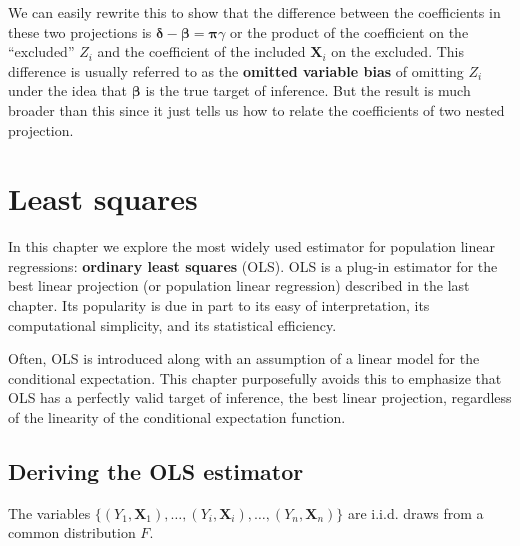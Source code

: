 \documentclass[
  letterpaper,
  DIV=11,
  numbers=noendperiod]{scrreprt}
\newcommand{\mb}{\symbf}
\newcommand{\X}{\mb{X}}
\newcommand{\bfbeta}{\mb{\beta}}
\theoremstyle{definition}
\theoremstyle{plain}
\theoremstyle{definition}
\theoremstyle{remark}
\begin{document}
We can easily rewrite this to show that the difference between the
coefficients in these two projections is
\(\mb{\delta} - \bfbeta= \mb{\pi}\gamma\) or the product of the
coefficient on the ``excluded'' \(Z_i\) and the coefficient of the
included \(\X_i\) on the excluded. This difference is usually referred
to as the \textbf{omitted variable bias} of omitting \(Z_i\) under the
idea that \(\bfbeta\) is the true target of inference. But the result is
much broader than this since it just tells us how to relate the
coefficients of two nested projection.


\hypertarget{least-squares}{%
\chapter{Least squares}\label{least-squares}}

In this chapter we explore the most widely used estimator for population
linear regressions: \textbf{ordinary least squares} (OLS). OLS is a
plug-in estimator for the best linear projection (or population linear
regression) described in the last chapter. Its popularity is due in part
to its easy of interpretation, its computational simplicity, and its
statistical efficiency.

Often, OLS is introduced along with an assumption of a linear model for
the conditional expectation. This chapter purposefully avoids this to
emphasize that OLS has a perfectly valid target of inference, the best
linear projection, regardless of the linearity of the conditional
expectation function.

\hypertarget{deriving-the-ols-estimator}{%
\section{Deriving the OLS estimator}\label{deriving-the-ols-estimator}}

\begin{tcolorbox}[enhanced jigsaw, title=\textcolor{quarto-callout-note-color}{\faInfo}\hspace{0.5em}{Assumption}, breakable, titlerule=0mm, opacityback=0, rightrule=.15mm, bottomrule=.15mm, colframe=quarto-callout-note-color-frame, coltitle=black, colbacktitle=quarto-callout-note-color!10!white, bottomtitle=1mm, toptitle=1mm, colback=white, arc=.35mm, opacitybacktitle=0.6, toprule=.15mm, leftrule=.75mm, left=2mm]

The variables
\(\{(Y_1, \X_1), \ldots, (Y_i,\X_i), \ldots, (Y_n, \X_n)\}\) are i.i.d.
draws from a common distribution \(F\).

\end{tcolorbox}
\end{document}
